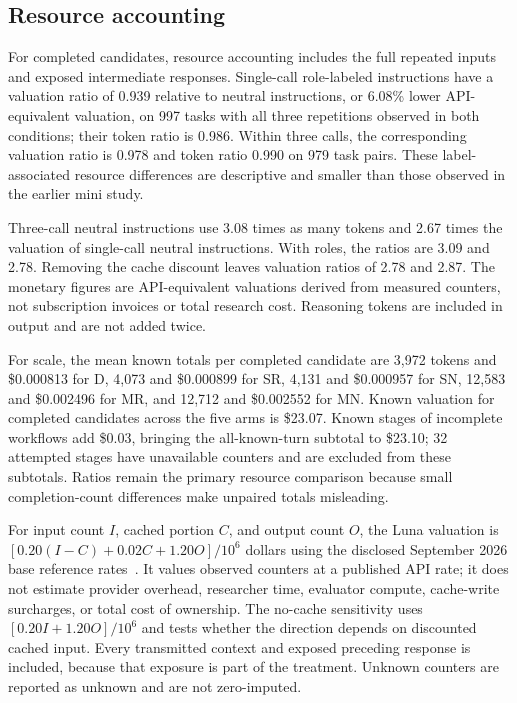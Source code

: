 


\subsection{Resource accounting}
For completed candidates, resource accounting includes the full repeated inputs and exposed intermediate responses. Single-call role-labeled instructions have a valuation ratio of 0.939 relative to neutral instructions, or 6.08\% lower API-equivalent valuation, on 997 tasks with all three repetitions observed in both conditions; their token ratio is 0.986. Within three calls, the corresponding valuation ratio is 0.978 and token ratio 0.990 on 979 task pairs. These label-associated resource differences are descriptive and smaller than those observed in the earlier mini study.

Three-call neutral instructions use 3.08 times as many tokens and 2.67 times the valuation of single-call neutral instructions. With roles, the ratios are 3.09 and 2.78. Removing the cache discount leaves valuation ratios of 2.78 and 2.87. The monetary figures are API-equivalent valuations derived from measured counters, not subscription invoices or total research cost. Reasoning tokens are included in output and are not added twice.

For scale, the mean known totals per completed candidate are 3,972 tokens and \$0.000813 for D, 4,073 and \$0.000899 for SR, 4,131 and \$0.000957 for SN, 12,583 and \$0.002496 for MR, and 12,712 and \$0.002552 for MN. Known valuation for completed candidates across the five arms is \$23.07. Known stages of incomplete workflows add \$0.03, bringing the all-known-turn subtotal to \$23.10; 32 attempted stages have unavailable counters and are excluded from these subtotals. Ratios remain the primary resource comparison because small completion-count differences make unpaired totals misleading.

For input count $I$, cached portion $C$, and output count $O$, the Luna valuation is $[0.20(I-C)+0.02C+1.20O]/10^6$ dollars using the disclosed September 2026 base reference rates~\citep{openai56luna2026,openaipricing2026}. It values observed counters at a published API rate; it does not estimate provider overhead, researcher time, evaluator compute, cache-write surcharges, or total cost of ownership. The no-cache sensitivity uses $[0.20I+1.20O]/10^6$ and tests whether the direction depends on discounted cached input. Every transmitted context and exposed preceding response is included, because that exposure is part of the treatment. Unknown counters are reported as unknown and are not zero-imputed.

